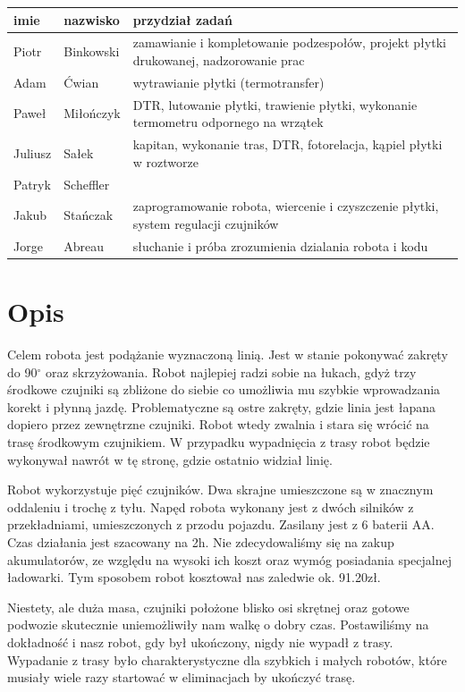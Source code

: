 \documentclass[a4paper,11pt]{article}
\begin{document}
\begin{center}
\begin{tabularx}{\textwidth}{|l|l|X|}
\hline
imie		& nazwisko		& przydział zadań \\ \hline
Piotr	& Binkowski		& zamawianie i kompletowanie podzespołów, projekt płytki drukowanej, nadzorowanie prac			\\
Adam		& Ćwian			& wytrawianie płytki (termotransfer)			\\
Paweł	& Miłończyk		& DTR, lutowanie płytki, trawienie płytki, wykonanie termometru odpornego na wrzątek			\\
Juliusz & Sałek			& kapitan, wykonanie tras, DTR, fotorelacja, kąpiel płytki w roztworze			\\
Patryk	& Scheffler		&			\\
Jakub	& Stańczak		& zaprogramowanie robota, wiercenie i czyszczenie płytki, system regulacji czujników			\\
Jorge	& Abreau			& słuchanie i próba zrozumienia dzialania robota i kodu	\\ \hline
\end{tabularx}
\end{center}

\tableofcontents

\listoffigures

\section{Opis}
Celem robota jest podążanie wyznaczoną linią. Jest w stanie pokonywać zakręty do 90$^\circ$ oraz skrzyżowania. Robot najlepiej radzi sobie na łukach, gdyż trzy środkowe czujniki są zbliżone do siebie co umożliwia mu szybkie wprowadzania korekt i płynną jazdę. Problematyczne są ostre zakręty, gdzie linia jest łapana dopiero przez zewnętrzne czujniki. Robot wtedy zwalnia i stara się wrócić na trasę środkowym czujnikiem. W przypadku wypadnięcia z trasy robot będzie wykonywał nawrót w tę stronę, gdzie ostatnio widział linię.

Robot wykorzystuje pięć czujników. Dwa skrajne umieszczone są w znacznym oddaleniu i trochę z tyłu.
Napęd robota wykonany jest z dwóch silników z przekładniami, umieszczonych z przodu pojazdu. Zasilany jest z 6 baterii AA. Czas działania jest szacowany na 2h. Nie zdecydowaliśmy się na zakup akumulatorów, ze względu na wysoki ich koszt oraz wymóg posiadania specjalnej ładowarki. Tym sposobem robot kosztował nas zaledwie ok. 91.20zł.

Niestety, ale duża masa, czujniki położone blisko osi skrętnej oraz gotowe podwozie skutecznie uniemożliwiły nam walkę o dobry czas. Postawiliśmy na dokładność i nasz robot, gdy był ukończony, nigdy nie wypadł z trasy. Wypadanie z trasy było charakterystyczne dla szybkich i małych robotów, które musiały wiele razy startować w eliminacjach by ukończyć trasę.
\end{document}
